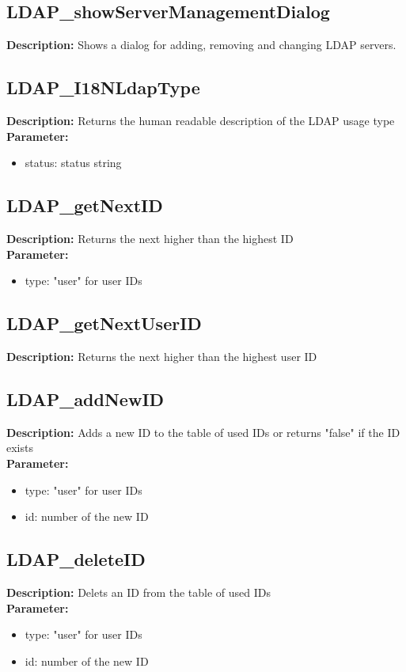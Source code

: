 \subsection{LDAP\_showServerManagementDialog}
\textbf{Description:} Shows a dialog for adding, removing and changing LDAP servers.\\

\subsection{LDAP\_I18NLdapType}
\textbf{Description:} Returns the human readable description of the LDAP usage type \\
\textbf{Parameter:}
\begin{itemize}
\item status: status string
\end{itemize}

\subsection{LDAP\_getNextID}
\textbf{Description:} Returns the next higher than the highest ID\\
\textbf{Parameter:}
\begin{itemize}
\item type: "user" for user IDs
\end{itemize}

\subsection{LDAP\_getNextUserID}
\textbf{Description:} Returns the next higher than the highest user ID\\

\subsection{LDAP\_addNewID}
\textbf{Description:} Adds a new ID to the table of used IDs or returns "false" if the ID exists\\
\textbf{Parameter:}
\begin{itemize}
\item type: "user" for user IDs
\item id: number of the new ID
\end{itemize}

\subsection{LDAP\_deleteID}
\textbf{Description:} Delets an ID from the table of used IDs\\
\textbf{Parameter:}
\begin{itemize}
\item type: "user" for user IDs
\item id: number of the new ID
\end{itemize}

